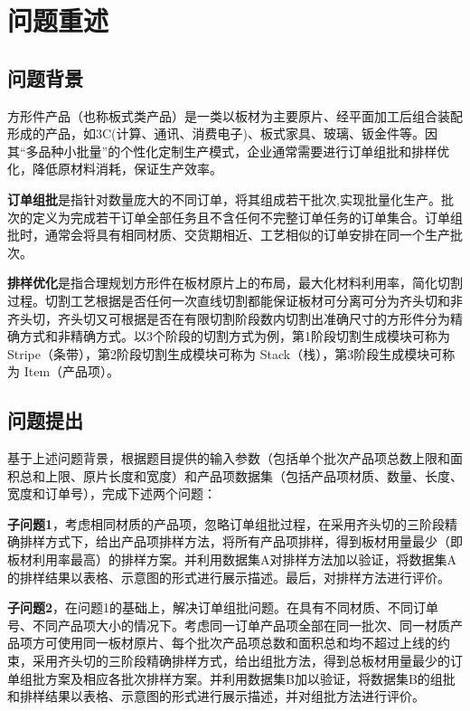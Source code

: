 \documentclass[bwprint]{gmcmthesis}
\begin{document}
\section{问题重述}
\subsection{问题背景}

方形件产品（也称板式类产品）是一类以板材为主要原片、经平面加工后组合装配形成的产品，如3C(计算、通讯、消费电子)、板式家具、玻璃、钣金件等。因其“多品种小批量”的个性化定制生产模式，企业通常需要进行订单组批和排样优化，降低原材料消耗，保证生产效率。

\textbf{订单组批}是指针对数量庞大的不同订单，将其组成若干批次,实现批量化生产。批次的定义为完成若干订单全部任务且不含任何不完整订单任务的订单集合。订单组批时，通常会将具有相同材质、交货期相近、工艺相似的订单安排在同一个生产批次。

\textbf{排样优化}是指合理规划方形件在板材原片上的布局，最大化材料利用率，简化切割过程。切割工艺根据是否任何一次直线切割都能保证板材可分离可分为齐头切和非齐头切，齐头切又可根据是否在有限切割阶段数内切割出准确尺寸的方形件分为精确方式和非精确方式。以3个阶段的切割方式为例，第1阶段切割生成模块可称为 {\rm Stripe}（条带），第2阶段切割生成模块可称为 {\rm Stack}（栈），第3阶段生成模块可称为 {\rm Item}（产品项）。

\quad
\subsection{问题提出}
基于上述问题背景，根据题目提供的输入参数（包括单个批次产品项总数上限和面积总和上限、原片长度和宽度）和产品项数据集（包括产品项材质、数量、长度、宽度和订单号），完成下述两个问题：

\textbf{子问题1}，考虑相同材质的产品项，忽略订单组批过程，在采用齐头切的三阶段精确排样方式下，给出产品项排样方法，将所有产品项排样，得到板材用量最少（即板材利用率最高）的排样方案。并利用数据集A对排样方法加以验证，将数据集A的排样结果以表格、示意图的形式进行展示描述。最后，对排样方法进行评价。

\textbf{子问题2}，在问题1的基础上，解决订单组批问题。在具有不同材质、不同订单号、不同产品项大小的情况下。考虑同一订单产品项全部在同一批次、同一材质产品项方可使用同一板材原片、每个批次产品项总数和面积总和均不超过上线的约束，采用齐头切的三阶段精确排样方式，给出组批方法，得到总板材用量最少的订单组批方案及相应各批次排样方案。并利用数据集B加以验证，将数据集B的组批和排样结果以表格、示意图的形式进行展示描述，并对组批方法进行评价。
\end{document}
